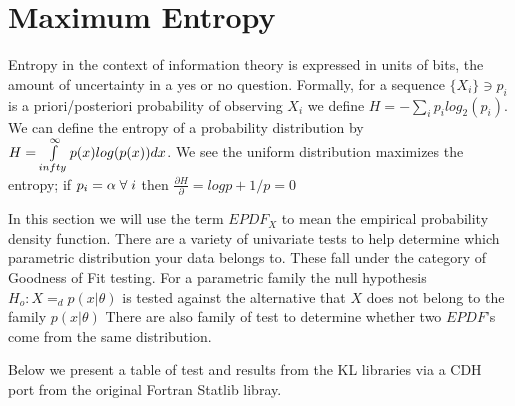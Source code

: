 \section{Maximum Entropy}
Entropy in the context of information theory is expressed in
units of bits, the amount of uncertainty in a yes or no
question. Formally, for a sequence $ \{X_i\} \ni p_i  $ is a
priori/posteriori probability of observing $X_i$ we define $H=-
\sum\limits_{i} p_i log_2( p_i) $.  We can define the entropy
of a probability distribution by
$H=\int\limits_{\-infty}^{\infty} p(x) log( p(x) ) dx $.  We
see the uniform distribution maximizes the entropy; if
$p_i=\alpha \; \forall \; i$ then $\frac{\partial H}{\partial } = log p
+1/p=0 $


In this section we will use the term $EPDF_X$ to mean the
empirical probability density function. There are a variety of
univariate tests to help determine which parametric
distribution your data belongs to. These fall under the
category of Goodness of Fit testing. For a parametric family
the null hypothesis $H_o : X=_d p(x| \theta)$ is tested against
the alternative that $X$ does not belong to the family
$p(x|\theta)$ There are also family of test to determine
whether two $EPDF$'s come from the same distribution.

Below we present a table of test and results from the KL
libraries via a CDH port from the original Fortran Statlib
libray.

